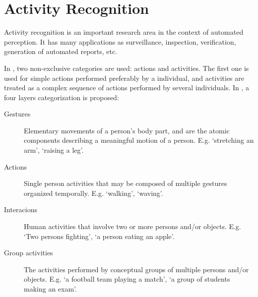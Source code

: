 \documentclass[a4paper, 12pt, openany, oneside]{book}
\begin{document}



\section{Activity Recognition} %

Activity recognition is an important research area in the context of automated perception. 
It has many applications as surveillance, inspection, verification, generation of automated reports, etc.


In \citep{Turaga2008_MaRecHuAcSurv}, two non-exclusive categories are used: actions and activities.
The first one is used for simple actions performed preferably by a individual, and activities are treated as a complex sequence of actions performed by several individuals. In \citep{Aggarwal11_HumanActivity}, a four layers categorization is proposed:

\begin{description}
\item[Gestures] Elementary movements of a person's body part, and are the atomic components describing a meaningful motion of a person. 
E.g. `stretching an arm', `raising a leg'.
\item[Actions] Single person activities that may be composed of multiple gestures organized temporally. 
E.g. `walking', `waving'.
\item[Interacions] Human activities that involve two or more persons and/or objects. 
E.g. `Two persons fighting', `a person eating an apple'.
\item[Group activities] The activities performed by conceptual groups of multiple persons and/or objects. 
E.g. `a football team playing a match', `a group of students making an exam'.
\end{description}
\end{document}
